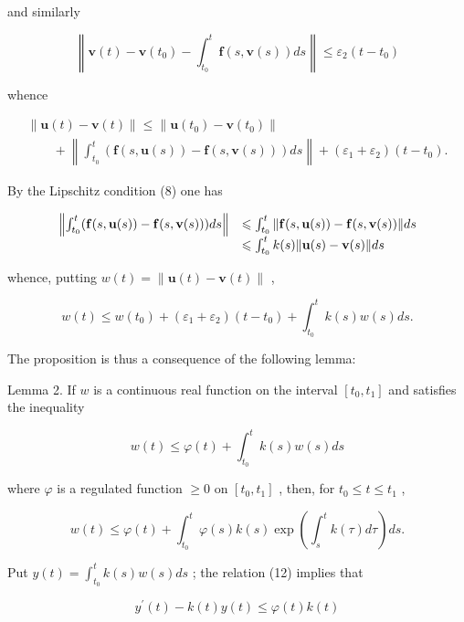 and similarly

\[
\left\| \mathbf {v} (t) - \mathbf {v} (t _ {0}) - \int_ {t _ {0}} ^ {t} \mathbf {f} (s, \mathbf {v} (s)) d s \right\| \leqslant \varepsilon_ {2} (t - t _ {0})
\]

whence

\[
\begin{array}{l} \| \mathbf {u} (t) - \mathbf {v} (t) \| \leqslant \| \mathbf {u} (t _ {0}) - \mathbf {v} (t _ {0}) \| \\ \qquad + \left\| \int_ {t _ {0}} ^ {t} (\mathbf {f} (s, \mathbf {u} (s)) - \mathbf {f} (s, \mathbf {v} (s))) d s \right\| + (\varepsilon_ {1} + \varepsilon_ {2}) (t - t _ {0}). \end{array}
\]

By the Lipschitz condition (8) one has

\[
\begin{array}{r l} \left\| \int_ {t _ {0}} ^ {t} (\mathbf {f} (s, \mathbf {u} (s)) - \mathbf {f} (s, \mathbf {v} (s))) d s \right\| & \leqslant \int_ {t _ {0}} ^ {t} \| \mathbf {f} (s, \mathbf {u} (s)) - \mathbf {f} (s, \mathbf {v} (s)) \| d s \\ & \leqslant \int_ {t _ {0}} ^ {t} k (s) \| \mathbf {u} (s) - \mathbf {v} (s) \| d s \end{array}
\]

whence, putting \(w(t) = \|\mathbf{u}(t) - \mathbf{v}(t)\|\) ,

\[
w (t) \leqslant w \left(t _ {0}\right) + \left(\varepsilon_ {1} + \varepsilon_ {2}\right) \left(t - t _ {0}\right) + \int_ {t _ {0}} ^ {t} k (s) w (s) d s.\tag{11}
\]

The proposition is thus a consequence of the following lemma:

Lemma 2. If \(w\) is a continuous real function on the interval \([t_0, t_1]\) and satisfies the inequality

\[
w (t) \leqslant \varphi (t) + \int_ {t _ {0}} ^ {t} k (s) w (s) d s\tag{12}
\]

where \(\varphi\) is a regulated function \(\geqslant 0\) on \([t_0, t_1]\) , then, for \(t_0 \leqslant t \leqslant t_1\) ,

\[
w (t) \leqslant \varphi (t) + \int_ {t _ {0}} ^ {t} \varphi (s) k (s) \exp \left(\int_ {s} ^ {t} k (\tau) d \tau\right) d s.\tag{13}
\]

Put \(y(t) = \int_{t_0}^{t} k(s)w(s)ds\) ; the relation (12) implies that

\[
y ^ {\prime} (t) - k (t) y (t) \leqslant \varphi (t) k (t)\tag{14}
\]

